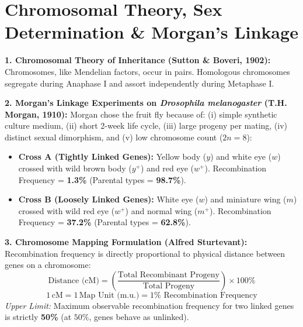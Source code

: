 \documentclass[10pt,twoside,openright]{book}
\begin{document}
\section{Chromosomal Theory, Sex Determination \& Morgan's Linkage}

\begin{formulabox}
\textbf{1. Chromosomal Theory of Inheritance (Sutton \& Boveri, 1902):}
Chromosomes, like Mendelian factors, occur in pairs. Homologous chromosomes segregate during Anaphase I and assort independently during Metaphase I.

\textbf{2. Morgan's Linkage Experiments on \textit{Drosophila melanogaster} (T.H. Morgan, 1910):}
Morgan chose the fruit fly because of: (i) simple synthetic culture medium, (ii) short 2-week life cycle, (iii) large progeny per mating, (iv) distinct sexual dimorphism, and (v) low chromosome count ($2n=8$):
\begin{itemize}
  \item \textbf{Cross A (Tightly Linked Genes):} Yellow body ($y$) and white eye ($w$) crossed with wild brown body ($y^+$) and red eye ($w^+$). Recombination Frequency = \textbf{1.3\%} (Parental types = \textbf{98.7\%}).
  \item \textbf{Cross B (Loosely Linked Genes):} White eye ($w$) and miniature wing ($m$) crossed with wild red eye ($w^+$) and normal wing ($m^+$). Recombination Frequency = \textbf{37.2\%} (Parental types = \textbf{62.8\%}).
\end{itemize}

\textbf{3. Chromosome Mapping Formulation (Alfred Sturtevant):}
Recombination frequency is directly proportional to physical distance between genes on a chromosome:
\begin{equation}
  \text{Distance (cM)} = \left(\frac{\text{Total Recombinant Progeny}}{\text{Total Progeny}}\right) \times 100\%
\end{equation}
\begin{equation}
  1\,\text{cM} = 1\,\text{Map Unit (m.u.)} = 1\%\text{ Recombination Frequency}
\end{equation}
\textit{Upper Limit:} Maximum observable recombination frequency for two linked genes is strictly \textbf{50\%} (at $50\%$, genes behave as unlinked).


\end{formulabox}
\end{document}
